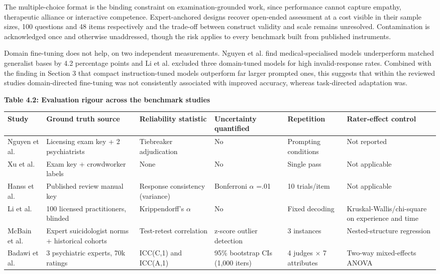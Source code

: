 \documentclass[11pt]{article}
\begin{document}
	The multiple-choice format is the binding constraint on examination-grounded work, since performance cannot capture empathy, therapeutic alliance or interactive competence. Expert-anchored designs recover open-ended assessment at a cost visible in their sample sizes, 100 questions and 48 items respectively and the trade-off between construct validity and scale remains unresolved. Contamination is acknowledged once and otherwise unaddressed, though the risk applies to every benchmark built from published instruments.
	
	Domain fine-tuning does not help, on two independent measurements. Nguyen et al. find medical-specialised models underperform matched generalist bases by 4.2 percentage points and Li et al. excluded three domain-tuned models for high invalid-response rates. Combined with the finding in Section 3 that compact instruction-tuned models outperform far larger prompted ones, this suggests that within the reviewed studies domain-directed fine-tuning was not consistently associated with improved accuracy, whereas task-directed adaptation was.
	
	\begin{center}
		\textbf{Table 4.2: Evaluation rigour across the benchmark studies}
		\vspace{2pt}
		
		\scriptsize
		\setlength{\tabcolsep}{3pt}\renewcommand{\arraystretch}{1.1}
		\begin{tabularx}{\textwidth}{|X|X|X|X|X|X|}
			\hline
			\textbf{Study} & \textbf{Ground truth source} & \textbf{Reliability statistic} & \textbf{Uncertainty quantified} & \textbf{Repetition} & \textbf{Rater-effect control} \\
			\hline
			Nguyen et al.\cite{nguyen-etal-2025-large} & Licensing exam key + 2 psychiatrists & Tiebreaker adjudication & No & Prompting conditions & Not reported \\
			\hline
			Xu et al.\cite{Xu2025} & Exam key + crowdworker labels & None & No & Single pass & Not applicable \\
			\hline
			Hanss et al.\cite{Hanss2025} & Published review manual key & Response consistency (variance) & Bonferroni $\alpha$ =.01 & 10 trials/item & Not applicable \\
			\hline
			Li et al.\cite{li2026counselbenchlargescaleexpertevaluation} & 100 licensed practitioners, blinded & Krippendorff's $\alpha$ & No & Fixed decoding & Kruskal-Wallis/chi-square on experience and time \\
			\hline
			McBain et al.\cite{MCBAIN2025} & Expert suicidologist norms + historical cohorts & Test-retest correlation & z-score outlier detection & 3 instances & Nested-structure regression \\
			\hline
			Badawi et al.\cite{badawi-etal-2026-trust} & 3 psychiatric experts, 70k ratings & ICC(C,1) and ICC(A,1) & 95\% bootstrap CIs (1,000 iters) & 4 judges $\times$ 7 attributes & Two-way mixed-effects ANOVA \\
			\hline
		\end{tabularx}
	\end{center}
	
\end{document}
